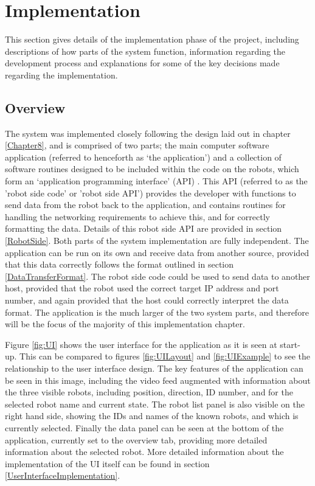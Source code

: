 
\chapter[Implementation]{Implementation} %

\label{Chapter9} %


This section gives details of the implementation phase of the project, including descriptions of how parts of the system function, information regarding the development process and explanations for some of the key decisions made regarding the implementation.

\section{Overview}
The system was implemented closely following the design laid out in chapter \ref{Chapter8}, and is comprised of two parts; the main computer software application (referred to henceforth as `the application') and a collection of software routines designed to be included within the code on the robots, which form an `application programming interface' (API) . This API (referred to as the 'robot side code' or 'robot side API') provides the developer with functions to send data from the robot back to the application, and contains routines for handling the networking requirements to achieve this, and for correctly formatting the data. Details of this robot side API are provided in section \ref{RobotSide}. Both parts of the system implementation are fully independent. The application can be run on its own and receive data from another source, provided that this data correctly follows the format outlined in section \ref{DataTransferFormat}. The robot side code could be used to send data to another host, provided that the robot used the correct target IP address and port number, and again provided that the host could correctly interpret the data format. The application is the much larger of the two system parts, and therefore will be the focus of the majority of this implementation chapter.

Figure \ref{fig:UI} shows the user interface for the application as it is seen at start-up. This can be compared to figures \ref{fig:UILayout} and \ref{fig:UIExample} to see the relationship to the user interface design. The key features of the application can be seen in this image, including the video feed augmented with information about the three visible robots, including position, direction, ID number, and for the selected robot name and current state. The robot list panel is also visible on the right hand side, showing the IDs and names of the known robots, and which is currently selected. Finally the data panel can be seen at the bottom of the application, currently set to the overview tab, providing more detailed information about the selected robot. More detailed information about the implementation of the UI itself can be found in section \ref{UserInterfaceImplementation}.

